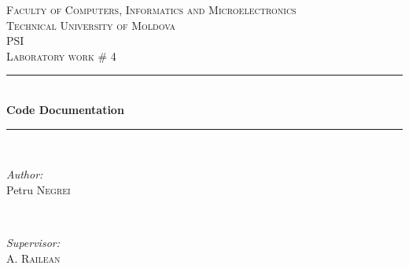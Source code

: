 \documentclass{article}
\begin{document}
  \begin{titlepage}

 \newcommand{\HRule}{\rule{\linewidth}{0.5mm}} %
  \begin{center} %

  \textsc{\Large Faculty of Computers, Informatics and Microelectronics}\\[0.5cm]
  \textsc{\LARGE Technical University of Moldova}\\[1.2cm] %
  \vspace{25 mm}
  \textsc{\Large PSI}\\[0.5cm] %
  \textsc{\large Laboratory work \# 4}\\[0.5cm] %

  \vspace{10 mm}
  \HRule \\[0.4cm]
  { \LARGE \bfseries Code Documentation }\\[0.4cm] %
  \HRule \\[1.5cm]

  \vspace{40mm}

  \begin{minipage}{0.4\textwidth}
  \begin{flushleft} \large
  \emph{Author:}\\
  Petru \textsc{Negrei} %
  \end{flushleft}
  \end{minipage}
  ~
  \begin{minipage}{0.4\textwidth}
  \begin{flushright} \large
  \emph{Supervisor:} \\
  A. \textsc{Railean} %
  \end{flushright}
  \end{minipage}\\[4cm]


\end{center}
\end{titlepage}
\end{document}
